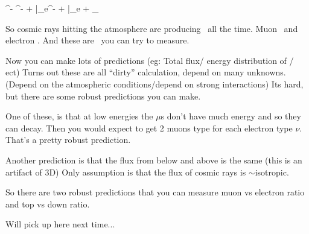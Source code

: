{\be
\pi^- \rightarrow \mu^- + \bar{\nu}_\nu \rightarrow e^- + \bar{\nu_e} + \nu_\mu
\ee

So cosmic rays hitting the atmosphere are producing \nus\ all the time.  
Muon \nus\ and electron \nus. 
And these are \nus\ you can try to measure. 

Now you can make lots of predictions (eg: Total flux/ energy distribution of \nus / ect)
Turns out these are all ``dirty'' calculation,  depend on many unknowns. (Depend on the atmospheric conditions/depend on strong interactions) 
Its hard, but there are some robust predictions you can make. 

One of these, is that at low energies the $\mu$s don't have much energy and so they can decay. 
Then you would expect to get 2 muons type \nus for each electron type $\nu$. 
That's a pretty robust prediction. 

Another prediction is that the flux from below and above is the same (this is an artifact of 3D) 
Only assumption is that the flux of cosmic rays is $\sim$isotropic.

So there are two robust predictions that you can measure muon vs electron ratio and top vs down ratio. 

Will pick up here next time...

 




}



